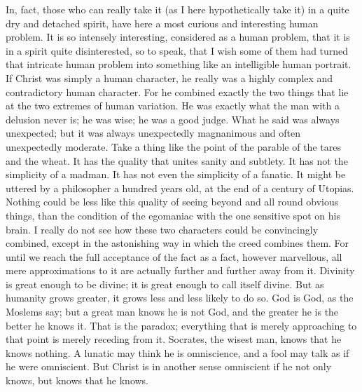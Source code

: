 In, fact, those who can really take it (as I here hypothetically take it) in a quite dry and detached spirit, have here a most curious and interesting human problem. It is so intensely interesting, considered as a human problem, that it is in a spirit quite disinterested, so to speak, that I wish some of them had turned that intricate human problem into something like an intelligible human portrait. If Christ was simply a human character, he really was a highly complex and contradictory human character. For he combined exactly the two things that lie at the two extremes of human variation. He was exactly what the man with a delusion never is; he was wise; he was a good judge. What he said was always unexpected; but it was always unexpectedly magnanimous and often unexpectedly moderate. Take a thing like the point of the parable of the tares and the wheat. It has the quality that unites sanity and subtlety. It has not the simplicity of a madman. It has not even the simplicity of a fanatic. It might be uttered by a philosopher a hundred years old, at the end of a century of Utopias. Nothing could be less like this quality of seeing beyond and all round obvious things, than the condition of the egomaniac with the one sensitive spot on his brain. I really do not see how these two characters could be convincingly combined, except in the astonishing way in which the creed combines them. For until we reach the full acceptance of the fact as a fact, however marvellous, all mere approximations to it are actually further and further away from it. Divinity is great enough to be divine; it is great enough to call itself divine. But as humanity grows greater, it grows less and less likely to do so. God is God, as the Moslems say; but a great man knows he is not God, and the greater he is the better he knows it. That is the paradox; everything that is merely approaching to that point is merely receding from it. Socrates, the wisest man, knows that he knows nothing. A lunatic may think he is omniscience, and a fool may talk as if he were omniscient. But Christ is in another sense omniscient if he not only knows, but knows that he knows.


